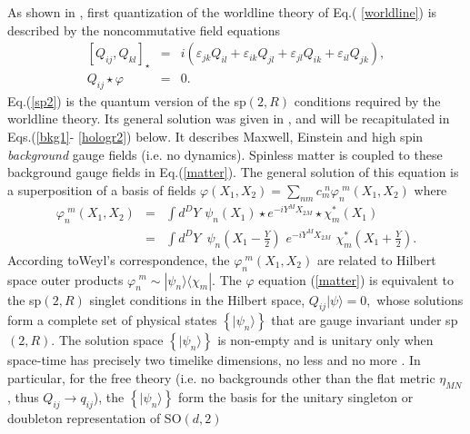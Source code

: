 \documentclass[a4paper,12pt]{article}
\begin{document}
As shown in \cite{NCSp}, first quantization of the worldline theory of Eq.(%
\ref{worldline}) is described by the noncommutative field equations 
\begin{eqnarray}
\left[ Q_{ij},Q_{kl}\right] _{\star } &=&i\left( \varepsilon
_{jk}Q_{il}+\varepsilon _{ik}Q_{jl}+\varepsilon _{jl}Q_{ik}+\varepsilon
_{il}Q_{jk}\right) ,  \label{sp2} \\
Q_{ij}\star \varphi &=&0.  \label{matter}
\end{eqnarray}
Eq.(\ref{sp2}) is the quantum version of the sp$\left( 2,R\right) $
conditions required by the worldline theory. Its general solution was given
in \cite{highspin}\cite{NCSp}, and will be recapitulated in Eqs.(\ref{bkg1}-%
\ref{hologr2}) below. It describes Maxwell, Einstein and high spin \textit{%
background} gauge fields (i.e. no dynamics). Spinless matter is coupled to
these background gauge fields in Eq.(\ref{matter}). The general solution of
this equation is a superposition of a basis of fields $\varphi \left(
X_{1},X_{2}\right) =\sum_{nm}c_{m}^{\,\,n}\varphi _{n}^{\,\,m}\left(
X_{1},X_{2}\right) $ where \cite{NCSp} 
\begin{eqnarray}
\varphi _{n}^{\,\,m}\left( X_{1},X_{2}\right) &=&\int d^{D}Y\,\,\psi
_{n}\left( X_{1}\right) \star e^{-iY^{M}X_{2M}}\star \chi _{m}^{\ast }\left(
X_{1}\right)  \label{wignerr} \\
&=&\int d^{D}Y\,\,\,\psi _{n}\left( X_{1}-\frac{Y}{2}\right)
\,\,e^{-iY^{M}X_{2M}}\,\,\chi _{m}^{\ast }\left( X_{1}+\frac{Y}{2}\right) .
\end{eqnarray}
According toWeyl's correspondence, the $\varphi _{n}^{\,\,m}\left(
X_{1},X_{2}\right) $ are related to Hilbert space outer products $\varphi
_{n}^{\,\,m}\sim |\psi _{n}\rangle \langle \chi _{m}|$. The $\varphi $
equation (\ref{matter}) is equivalent to the sp$\left( 2,R\right) $ singlet
conditions in the Hilbert space, $Q_{ij}|\psi \rangle =0,$ whose solutions
form a complete set of physical states $\left\{ |\psi _{n}\rangle \right\} $
that are gauge invariant under sp$\left( 2,R\right) .$ The solution space $%
\left\{ |\psi _{n}\rangle \right\} $ is non-empty and is unitary only when
space-time has precisely two timelike dimensions, no less and no more \cite
{field2T}\cite{NCSp}. In particular, for the free theory (i.e. no
backgrounds other than the flat metric $\eta _{MN}$, thus $Q_{ij}\rightarrow
q_{ij}$), the $\left\{ |\psi _{n}\rangle \right\} $ form the basis for the
unitary singleton or doubleton representation of SO$\left( d,2\right) $%
\end{document}
